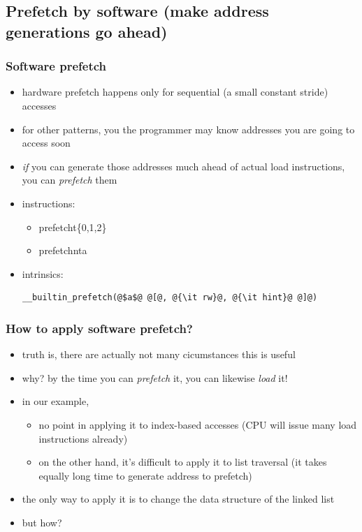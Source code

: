 \documentclass[12pt,dvipdfmx]{beamer}
\newcommand{\ao}[1]{{\color{blue}#1}}
\begin{document}
\subsection{Prefetch by software (make address generations go ahead)}

\begin{frame}[fragile]
\frametitle{Software prefetch}
\begin{itemize}
\item<1-> hardware prefetch happens only for sequential 
  (a small constant stride) accesses
\item<1-> for other patterns, you the programmer 
  may know addresses you are going to access soon
\item<2-> \ao{\emph{if}} you can generate those addresses 
  much ahead of actual load instructions, you can \ao{\emph{prefetch}} them
\item<3-> instructions:
  \begin{itemize}
  \item prefetcht\{0,1,2\}
  \item prefetchnta
  \end{itemize}
\item<4-> intrinsics:
\begin{lstlisting}
__builtin_prefetch(@$a$@ @[@, @{\it rw}@, @{\it hint}@ @]@)
\end{lstlisting}
\end{itemize}
\end{frame}


\begin{frame}[fragile]
\frametitle{How to apply software prefetch?}
\begin{itemize}
\item<1-> truth is, there are actually not many cicumstances this is useful
\item<2-> why?
  by the time you can \ao{\emph{prefetch}} it, 
  you can likewise \ao{\emph{load}} it!
\item<3-> in our example, 
  \begin{itemize}
  \item<3-> no point in applying it to index-based accesses 
    (CPU will issue many load instructions already)
  \item<4-> on the other hand, it's difficult to apply it to list traversal
    (it takes equally long time to generate address to prefetch)
  \end{itemize}
\item<5-> the only way to apply it is to change the data structure of the linked list
\item<6-> but how?
\end{itemize}
\end{frame}
\end{document}
